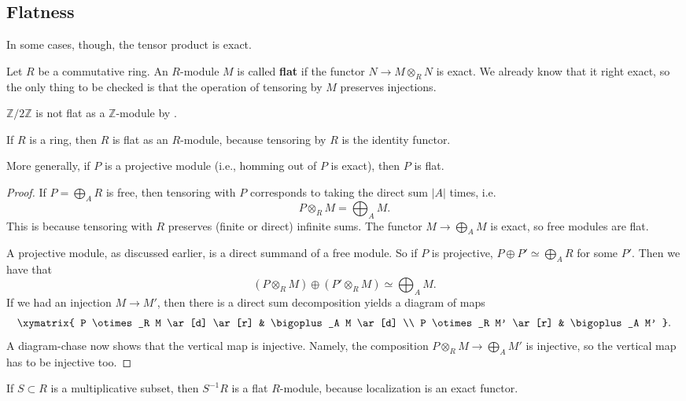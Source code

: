 \subsection{Flatness}
In some cases, though, the tensor product is exact.

\begin{definition}
Let $R$ be a commutative ring. An $R$-module $M$ is called \textbf{flat} if the
functor $N \to M \otimes_R N$ is exact. We already know that it right exact,
so the only thing to be checked is that the operation of  tensoring by $M$
preserves injections.
\end{definition}

\begin{example}
$\mathbb{Z}/2\mathbb{Z}$ is not flat as a $\mathbb{Z}$-module by
.

\end{example}

\begin{example}
If $R$ is a ring, then $R$ is flat as an $R$-module, because tensoring by $R$
is the identity functor.

More generally, if $P$ is a projective module (i.e., homming out of $P$
is exact), then $P$ is flat.
\end{example}
\begin{proof}
If $P  = \bigoplus_A R$ is free, then tensoring with $P$ corresponds to taking
the direct sum $|A|$ times, i.e.
\[ P \otimes_R M = \bigoplus_A M.  \]
This is because tensoring with $R$ preserves (finite or direct) infinite sums.
 The functor $M \to \bigoplus_A M$ is exact, so free
modules are flat.

A projective module, as discussed earlier, is a direct summand of a free
module. So if $P$ is projective, $P \oplus P' \simeq \bigoplus_A R$ for some
$P'$. Then we have that
\[ (P \otimes_R M) \oplus (P' \otimes_R M) \simeq \bigoplus_A M.  \]
If we had an injection $M \to M'$, then there is a direct sum decomposition
yields a diagram of maps
\[ \xymatrix{
P \otimes_R M \ar[d] \ar[r] &  \bigoplus_A M \ar[d]  \\
P \otimes_R M' \ar[r] &  \bigoplus_A M'
}.\]
A diagram-chase now shows that the vertical map is injective. Namely, the
composition $P \otimes_R M \to \bigoplus_A M'$ is injective, so the vertical
map has to be injective too.
\end{proof}

\begin{example} 
If $S \subset R$ is a multiplicative subset, then  $S^{-1}R $ is a flat $R$-module, because localization is an
exact functor.
\end{example} 

